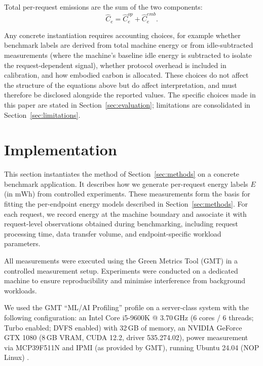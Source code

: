 \documentclass[sigconf]{acmart}
\begin{document}
Total per-request emissions are the sum of the two components:
\[
\widehat{C}_e = \widehat{C}^{op}_e + \widehat{C}^{emb}_e.
\]

Any concrete instantiation requires accounting choices, for example whether benchmark labels are derived from total machine energy or from idle-subtracted measurements (where the machine's baseline idle energy is subtracted to isolate the request-dependent signal), whether protocol overhead is included in calibration, and how embodied carbon is allocated. These choices do not affect the structure of the equations above but do affect interpretation, and must therefore be disclosed alongside the reported values. The specific choices made in this paper are stated in Section~\ref{sec:evaluation}; limitations are consolidated in Section~\ref{sec:limitations}.


\section{Implementation}
\label{sec:measurement}
This section instantiates the method of Section~\ref{sec:methods} on a concrete benchmark application. It describes how we generate per-request energy labels \(E\) (in \(\mathrm{mWh}\)) from controlled experiments. These measurements form the basis for fitting the per-endpoint energy models described in Section~\ref{sec:methods}. For each request, we record energy at the machine boundary and associate it with request-level observations obtained during benchmarking, including request processing time, data transfer volume, and endpoint-specific workload parameters.

All measurements were executed using the Green Metrics Tool (GMT) \cite{greenmetricstool} in a controlled measurement setup. Experiments were conducted on a dedicated machine to ensure reproducibility and minimise interference from background workloads.

We used the GMT ``ML/AI Profiling'' profile on a server-class system with the following configuration: an Intel Core i5-9600K @ 3.70\,GHz (6 cores / 6 threads; Turbo enabled; DVFS enabled) with 32\,GB of memory, an NVIDIA GeForce GTX 1080 (8\,GB VRAM, CUDA 12.2, driver 535.274.02), power measurement via MCP39F511N and IPMI (as provided by GMT), running Ubuntu 24.04 (NOP Linux) \cite{greenmetricstool}.
\end{document}
